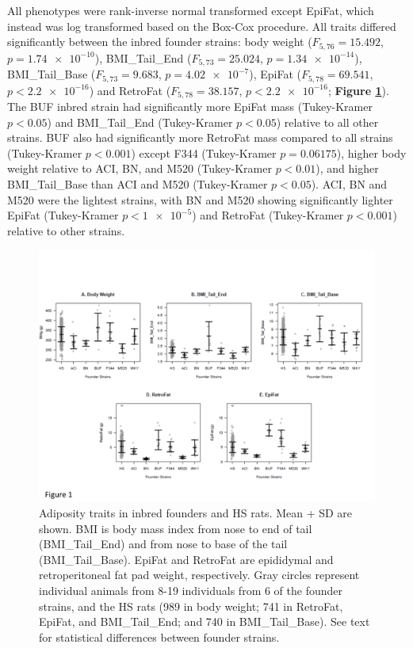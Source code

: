All phenotypes were rank-inverse normal transformed except EpiFat, which instead was log transformed based on the Box-Cox procedure.  All traits differed significantly between the inbred founder strains: body weight ($F_{5, 76} = 15.492$, $p = \num{1.74e-10}$), BMI\_Tail\_End ($F_{5, 73} = 25.024$, $p = \num{1.34e-14}$), BMI\_Tail\_Base ($F_{5, 73} = 9.683$, $p = \num{4.02e-7}$), EpiFat ($F_{5, 78} = 69.541$, $p < \num{2.2e-16}$) and RetroFat ($F_{5, 78} = 38.157$, $p < \num{2.2e-16}$; \textbf{Figure \ref{fig:founder_data}}).  The BUF inbred strain had significantly more EpiFat mass (Tukey-Kramer $p < 0.05$) and BMI\_Tail\_End (Tukey-Kramer $p < 0.05$) relative to all other strains.  BUF also had significantly more RetroFat mass compared to all strains (Tukey-Kramer $p < 0.001$) except F344 (Tukey-Kramer $p = 0.06175$), higher body weight relative to ACI, BN, and M520 (Tukey-Kramer $p < 0.01$), and higher BMI\_Tail\_Base than ACI and M520 (Tukey-Kramer $p < 0.05$).  ACI, BN and M520 were the lightest strains, with BN and M520 showing significantly lighter EpiFat (Tukey-Kramer $p < \num{1e-5}$) and RetroFat (Tukey-Kramer $p < 0.001$) relative to other strains.

\begin{figure}
\centering
\includegraphics[trim={0in 0.8in 0in 1in}, clip, width=\textwidth]{figures/5-hsrats/Figure1.pdf}
\caption[Adiposity traits in the HS rats and the inbred founders]{Adiposity traits in inbred founders and HS rats. Mean + SD are shown. BMI is body mass index from nose to end of tail (BMI\_Tail\_End) and from nose to base of the tail (BMI\_Tail\_Base). EpiFat and RetroFat are epididymal and retroperitoneal fat pad weight, respectively. Gray circles represent individual animals from 8-19 individuals from 6 of the founder strains, and the HS rats (989 in body weight; 741 in RetroFat, EpiFat, and BMI\_Tail\_End; and 740 in BMI\_Tail\_Base). See text for statistical differences between founder strains. \label{fig:founder_data}}
\end{figure}

